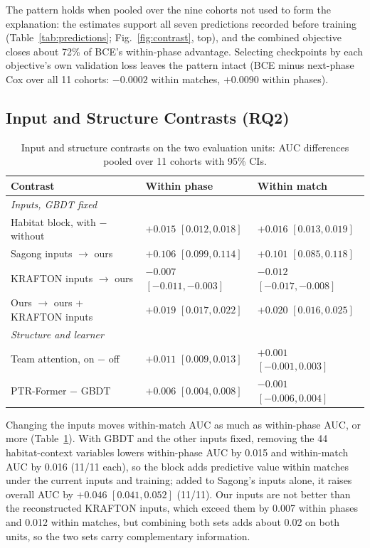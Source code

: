 \documentclass[sigconf,anonymous]{acmart}
\begin{document}

The pattern holds when pooled over the nine cohorts not used to form the explanation: the estimates support all seven predictions recorded before training (Table~\ref{tab:predictions}; Fig.~\ref{fig:contrast}, top), and the combined objective closes about 72\% of BCE's within-phase advantage. Selecting checkpoints by each objective's own validation loss leaves the pattern intact (BCE minus next-phase Cox over all 11 cohorts: $-0.0002$ within matches, $+0.0090$ within phases).

\subsection{Input and Structure Contrasts (RQ2)}
\label{sec:results:inputs}
\begin{table}[t]
\centering\scriptsize
\caption{Input and structure contrasts on the two evaluation units: AUC differences pooled over 11 cohorts with 95\% CIs.}
\label{tab:contrasts}
\setlength{\tabcolsep}{2.5pt}
\begin{tabular}{lll}
\toprule
Contrast & Within phase & Within match \\
\midrule
\multicolumn{3}{l}{\emph{Inputs, GBDT fixed}} \\
Habitat block, with $-$ without & $+0.015$ $[0.012, 0.018]$ & $+0.016$ $[0.013, 0.019]$ \\
Sagong inputs $\to$ ours & $+0.106$ $[0.099, 0.114]$ & $+0.101$ $[0.085, 0.118]$ \\
KRAFTON inputs $\to$ ours & $-0.007$ $[-0.011, -0.003]$ & $-0.012$ $[-0.017, -0.008]$ \\
Ours $\to$ ours + KRAFTON inputs & $+0.019$ $[0.017, 0.022]$ & $+0.020$ $[0.016, 0.025]$ \\
\midrule
\multicolumn{3}{l}{\emph{Structure and learner}} \\
Team attention, on $-$ off & $+0.011$ $[0.009, 0.013]$ & $+0.001$ $[-0.001, 0.003]$ \\
PTR-Former $-$ GBDT & $+0.006$ $[0.004, 0.008]$ & $-0.001$ $[-0.006, 0.004]$ \\
\bottomrule
\end{tabular}
\end{table}
Changing the inputs moves within-match AUC as much as within-phase AUC, or more (Table~\ref{tab:contrasts}). With GBDT and the other inputs fixed, removing the 44 habitat-context variables lowers within-phase AUC by 0.015 and within-match AUC by 0.016 (11/11 each), so the block adds predictive value within matches under the current inputs and training; added to Sagong's inputs alone, it raises overall AUC by $+0.046$ $[0.041,\allowbreak 0.052]$ (11/11). Our inputs are not better than the reconstructed KRAFTON inputs, which exceed them by 0.007 within phases and 0.012 within matches, but combining both sets adds about 0.02 on both units, so the two sets carry complementary information.
\end{document}
